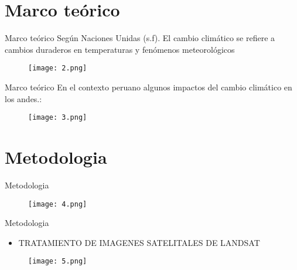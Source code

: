 \documentclass[handout,t]{beamer}
\begin{document}
\section{Marco teórico}
\begin{frame}{Marco teórico}
Según Naciones Unidas (s.f). El cambio climático se refiere a cambios duraderos en temperaturas y fenómenos meteorológicos
\begin{figure}
  \centering
  \texttt{[image: 2.png]}
\end{figure}
\end{frame}

\begin{frame}{Marco teórico}
En el contexto peruano algunos impactos del cambio climático en los andes.: 
\begin{figure}
  \centering
  \texttt{[image: 3.png]}
\end{figure}
\end{frame}

\section{Metodologia}
\begin{frame}{Metodologia}
\begin{figure}
  \centering
  \texttt{[image: 4.png]}
\end{figure}
\end{frame}

\begin{frame}{Metodologia}
\begin{itemize}
    \item \small{TRATAMIENTO DE IMAGENES SATELITALES DE LANDSAT}
    \end{itemize}
\begin{figure}
  \centering
  \texttt{[image: 5.png]}
\end{figure}
\end{frame}
\end{document}
